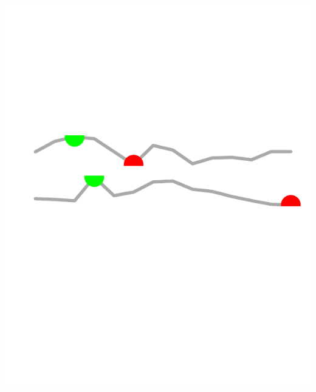 \documentclass{article}\usepackage[]{graphicx}\usepackage[]{color}
\makeatletter
\def\maxwidth{ %
  \ifdim\Gin@nat@width>\linewidth
    \linewidth
  \else
    \Gin@nat@width
  \fi
}
\makeatother
\begin{document}
\begin{minipage}[b]{0.99\textwidth}
\begin{minipage}[t]{0.99\textwidth}
\begin{minipage}[c]{0.11\textwidth}
{\centering \includegraphics[width=\maxwidth]{figure/createSparklines_macro-1} 

}



      \vspace*{-0.5cm}
    \end{minipage}
    

\end{minipage}
\end{minipage}
\end{document}
